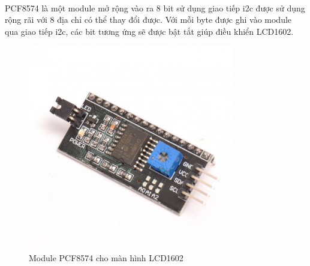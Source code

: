 \paragraph{}
PCF8574 là một module mở rộng vào ra 8 bit sử dụng giao tiếp \acrshort{i2c} được sử dụng rộng rãi với 8 địa chỉ có thể thay đổi được. Với mỗi byte được ghi vào module qua giao tiếp \acrshort{i2c}, các bit tương ứng sẽ được bật tắt giúp điều khiển LCD1602.
\begin{figure}[H]
    \centering
    \includegraphics[width=0.8\textwidth]{images/I2C_PCF.jpg}
    \caption{Module PCF8574 cho màn hình LCD1602}
    \label{fig:pcf8574}
\end{figure}